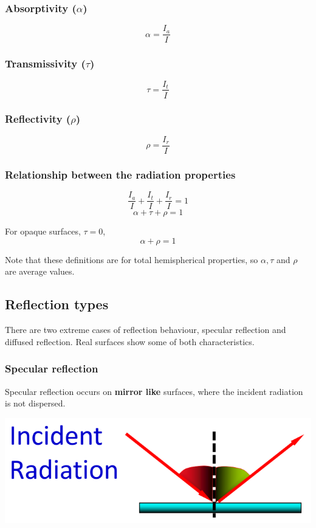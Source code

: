 \documentclass[11pt]{article}
\begin{document}
\subsubsection{Absorptivity (\(\alpha\))}
\label{sec:orgce75505}
\[\alpha = \frac{I_a}{I}\]

\subsubsection{Transmissivity (\(\tau\))}
\label{sec:org6f2b9c0}
\[\tau = \frac{I_t}{I}\]

\subsubsection{Reflectivity (\(\rho\))}
\label{sec:org3d2e563}
\[\rho = \frac{I_r}{I}\]

\subsubsection{Relationship between the radiation properties}
\label{sec:org84b01f1}
\[\frac{I_a}{I} + \frac{I_t}{I} + \frac{I_r}{I} = 1\]
\[\alpha + \tau + \rho = 1\]

For opaque surfaces, \(\tau = 0\),
\[\alpha + \rho = 1\]

Note that these definitions are for total hemispherical properties, so \(\alpha, \tau\) and \(\rho\) are average values.

\subsection{Reflection types}
\label{sec:orgcd975a8}
There are two extreme cases of reflection behaviour, specular reflection and diffused reflection. Real surfaces show some of both characteristics.

\subsubsection{Specular reflection}
\label{sec:org6a15ae4}
Specular reflection occurs on \textbf{mirror like} surfaces, where the incident radiation is not dispersed.
\begin{center}
\includegraphics[width=.9\linewidth]{./images/specular-reflection-diagram.png}
\end{center}
\end{document}
